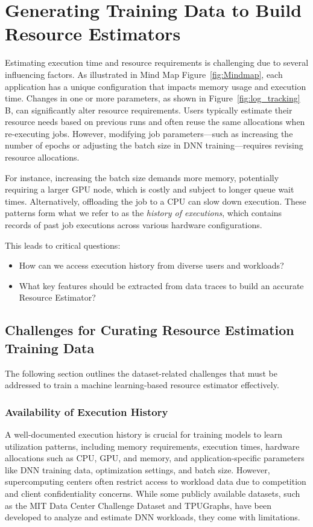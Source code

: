 \chapter{Generating Training Data to Build Resource Estimators}
\label{GenerateData.ch}

Estimating execution time and resource requirements is challenging due to several influencing factors. As illustrated in Mind Map Figure~\ref{fig:Mindmap}, each application has a unique configuration that impacts memory usage and execution time. Changes in one or more parameters, as shown in Figure~\ref{fig:log_tracking} B, can significantly alter resource requirements. Users typically estimate their resource needs based on previous runs and often reuse the same allocations when re-executing jobs. However, modifying job parameters—such as increasing the number of epochs or adjusting the batch size in DNN training—requires revising resource allocations.

For instance, increasing the batch size demands more memory, potentially requiring a larger GPU node, which is costly and subject to longer queue wait times. Alternatively, offloading the job to a CPU can slow down execution. These patterns form what we refer to as the \textit{history of executions}, which contains records of past job executions across various hardware configurations.

This leads to critical questions:
\begin{itemize}
    \item How can we access execution history from diverse users and workloads?
    \item What key features should be extracted from data traces to build an accurate Resource Estimator?
\end{itemize}

\section{Challenges for Curating Resource Estimation Training Data}
The following section outlines the dataset-related challenges that must be addressed to train a machine learning-based resource estimator effectively.

\subsection{Availability of Execution History}

A well-documented execution history is crucial for training models to learn utilization patterns, including memory requirements, execution times, hardware allocations such as CPU, GPU, and memory, and application-specific parameters like DNN training data, optimization settings, and batch size. However, supercomputing centers often restrict access to workload data due to competition and client confidentiality concerns. While some publicly available datasets, such as the MIT Data Center Challenge Dataset and TPUGraphs, have been developed to analyze and estimate DNN workloads, they come with limitations.

